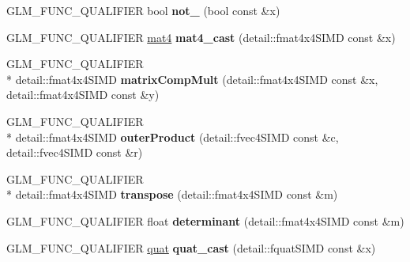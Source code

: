 \begin{DoxyCompactItemize}
\item 
\hypertarget{namespaceglm_a081b70b3c919d22f18bb04e6f9c3b7ca}{G\-L\-M\-\_\-\-F\-U\-N\-C\-\_\-\-Q\-U\-A\-L\-I\-F\-I\-E\-R bool {\bfseries not\-\_\-} (bool const \&x)}\label{namespaceglm_a081b70b3c919d22f18bb04e6f9c3b7ca}

\item 
\hypertarget{namespaceglm_aaea24a8e252f68832f4d368be2035889}{G\-L\-M\-\_\-\-F\-U\-N\-C\-\_\-\-Q\-U\-A\-L\-I\-F\-I\-E\-R \hyperlink{group__core__types_ga7dcd2365c2e368e6af5b7adeb6a9c8df}{mat4} {\bfseries mat4\-\_\-cast} (detail\-::fmat4x4\-S\-I\-M\-D const \&x)}\label{namespaceglm_aaea24a8e252f68832f4d368be2035889}

\item 
\hypertarget{namespaceglm_a3f8b69f9fddfae106e1a18ad66a17a1a}{G\-L\-M\-\_\-\-F\-U\-N\-C\-\_\-\-Q\-U\-A\-L\-I\-F\-I\-E\-R \\*
detail\-::fmat4x4\-S\-I\-M\-D {\bfseries matrix\-Comp\-Mult} (detail\-::fmat4x4\-S\-I\-M\-D const \&x, detail\-::fmat4x4\-S\-I\-M\-D const \&y)}\label{namespaceglm_a3f8b69f9fddfae106e1a18ad66a17a1a}

\item 
\hypertarget{namespaceglm_a24beb25b08989724431540bb9279937c}{G\-L\-M\-\_\-\-F\-U\-N\-C\-\_\-\-Q\-U\-A\-L\-I\-F\-I\-E\-R \\*
detail\-::fmat4x4\-S\-I\-M\-D {\bfseries outer\-Product} (detail\-::fvec4\-S\-I\-M\-D const \&c, detail\-::fvec4\-S\-I\-M\-D const \&r)}\label{namespaceglm_a24beb25b08989724431540bb9279937c}

\item 
\hypertarget{namespaceglm_a8a85a6f79193f0789bd2ed17802b70f6}{G\-L\-M\-\_\-\-F\-U\-N\-C\-\_\-\-Q\-U\-A\-L\-I\-F\-I\-E\-R \\*
detail\-::fmat4x4\-S\-I\-M\-D {\bfseries transpose} (detail\-::fmat4x4\-S\-I\-M\-D const \&m)}\label{namespaceglm_a8a85a6f79193f0789bd2ed17802b70f6}

\item 
\hypertarget{namespaceglm_a3d33b661dfd45c27b41440cd02605c05}{G\-L\-M\-\_\-\-F\-U\-N\-C\-\_\-\-Q\-U\-A\-L\-I\-F\-I\-E\-R float {\bfseries determinant} (detail\-::fmat4x4\-S\-I\-M\-D const \&m)}\label{namespaceglm_a3d33b661dfd45c27b41440cd02605c05}

\item 
\hypertarget{namespaceglm_a68af15a87ea3aac558767c9bb2ed141d}{G\-L\-M\-\_\-\-F\-U\-N\-C\-\_\-\-Q\-U\-A\-L\-I\-F\-I\-E\-R \hyperlink{namespaceglm_ac1f6a5957091b849730ea6f05a6b7ad6}{quat} {\bfseries quat\-\_\-cast} (detail\-::fquat\-S\-I\-M\-D const \&x)}\label{namespaceglm_a68af15a87ea3aac558767c9bb2ed141d}


\end{DoxyCompactItemize}
